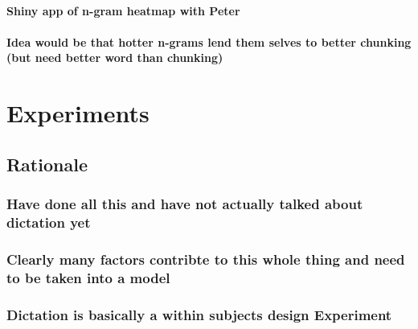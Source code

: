 \documentclass[]{book}
\theoremstyle{definition}
\theoremstyle{definition}
\theoremstyle{definition}
\theoremstyle{remark}
\begin{document}
\hypertarget{shiny-app-of-n-gram-heatmap-with-peter}{%
\subsubsection{Shiny app of n-gram heatmap with
Peter}\label{shiny-app-of-n-gram-heatmap-with-peter}}

\hypertarget{idea-would-be-that-hotter-n-grams-lend-them-selves-to-better-chunking-but-need-better-word-than-chunking}{%
\subsubsection{Idea would be that hotter n-grams lend them selves to
better chunking (but need better word than
chunking)}\label{idea-would-be-that-hotter-n-grams-lend-them-selves-to-better-chunking-but-need-better-word-than-chunking}}

\hypertarget{experiments}{%
\chapter{Experiments}\label{experiments}}

\hypertarget{rationale}{%
\section{Rationale}\label{rationale}}

\hypertarget{have-done-all-this-and-have-not-actually-talked-about-dictation-yet}{%
\subsection{Have done all this and have not actually talked about
dictation
yet}\label{have-done-all-this-and-have-not-actually-talked-about-dictation-yet}}

\hypertarget{clearly-many-factors-contribte-to-this-whole-thing-and-need-to-be-taken-into-a-model}{%
\subsection{Clearly many factors contribte to this whole thing and need
to be taken into a
model}\label{clearly-many-factors-contribte-to-this-whole-thing-and-need-to-be-taken-into-a-model}}

\hypertarget{dictation-is-basically-a-within-subjects-design-experiment}{%
\subsection{Dictation is basically a within subjects design
Experiment}\label{dictation-is-basically-a-within-subjects-design-experiment}}
\end{document}
